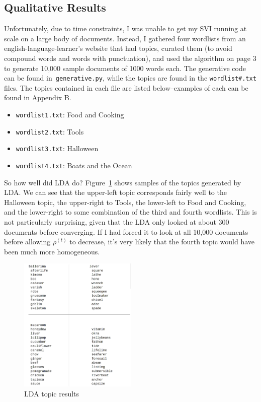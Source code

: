 \documentclass{article}
\begin{document}
\subsection{Qualitative Results}

Unfortunately, due to time constraints, I was unable to get my SVI running at
scale on a large body of documents. Instead, I gathered four wordlists from an
english-language-learner's website that had topics, curated them (to avoid
compound words and words with punctuation), and used the algorithm on page 3 to
generate 10,000 sample documents of 1000 words each. The generative code can be
found in\texttt{ generative.py}, while the topics are found in the
\texttt{wordlist\#.txt} files. The topics contained in each file are listed
below--examples of each can be found in Appendix B.

\begin{itemize}
\item \texttt{wordlist1.txt}: Food and Cooking
\item \texttt{wordlist2.txt}: Tools
\item \texttt{wordlist3.txt}: Halloween
\item \texttt{wordlist4.txt}: Boats and the Ocean
\end{itemize}
 
So how well did LDA do? Figure~\ref{fig:ldatopics} shows samples of the topics generated
by LDA. We can see that the upper-left topic corresponds fairly well to the
Halloween topic, the upper-right to Tools, the lower-left to Food and Cooking,
and the lower-right to some combination of the third and fourth wordlists. This
is not particularly surprising, given that the LDA only looked at about 300
documents before converging. If I had forced it to look at all 10,000 documents
before allowing $\rho^{(t)}$ to decrease, it's very likely that the fourth topic
would have been much more homogeneous.

\begin{figure}
  \centering
  \includegraphics[width=0.5\textwidth]{ldatopics}
  \caption{LDA topic results}
  \label{fig:ldatopics}
\end{figure}
\end{document}
